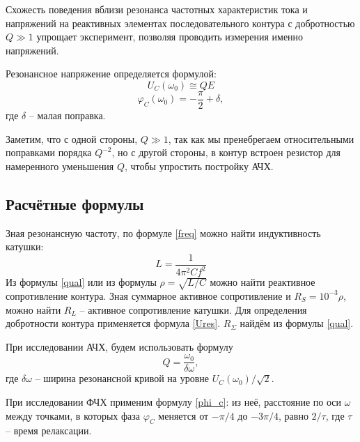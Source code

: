 \documentclass[a4paper]{article}
\begin{document}
Схожесть поведения вблизи резонанса частотных характеристик тока и напряжений на реактивных элементах последовательного контура с добротностью $ Q \gg 1 $ упрощает эксперимент, позволяя проводить измерения именно напряжений.

Резонансное напряжение определяется формулой:
\begin{equation}\label{resc}
	U_C (\omega_0) \cong Q E
\end{equation}
\begin{equation*}
	\varphi_C (\omega_0) = -\frac{\pi}{2}+\delta,
\end{equation*}
где $ \delta  $ -- малая поправка.

Заметим, что с одной стороны, $ Q \gg 1 $, так как мы пренебрегаем относительными поправками порядка $ Q^{-2} $, но с другой стороны, в контур встроен резистор для намеренного уменьшения $ Q $, чтобы упростить постройку АЧХ.
\subsection{Расчётные формулы}

Зная резонансную частоту, по формуле \eqref{freq} можно найти индуктивность катушки:
\begin{equation}\label{induct}
	L = \frac{1}{4 \pi ^2 C f^2}
\end{equation}
 Из формулы \eqref{qual} или из формулы $ \rho = \sqrt{L / C} $ можно найти реактивное сопротивление контура. Зная суммарное активное сопротивление и $ R_S = 10^{-3} \rho $, можно найти $ R_L $ -- активное сопротивление катушки. Для определения добротности контура применяется формула \eqref{Ures}.
 $ R_\Sigma $ найдём из формулы \eqref{qual}.
  
При исследовании АЧХ, будем использовать формулу
\begin{equation}\label{ACHH}
	Q = \frac{\omega_0}{\delta \omega},
\end{equation}
где $ \delta \omega $ -- ширина резонансной кривой на уровне $ U_C (\omega_0) / \sqrt{2} $.

При исследовании ФЧХ применим формулу \eqref{phi_c}: из неё, расстояние по оси $ \omega $ между точками, в которых фаза $ \varphi_C $ меняется от $ -\pi /4 $ до $ -3 \pi / 4 $, равно $ 2 / \tau $, где $ \tau  $ -- время релаксации.
\end{document}
